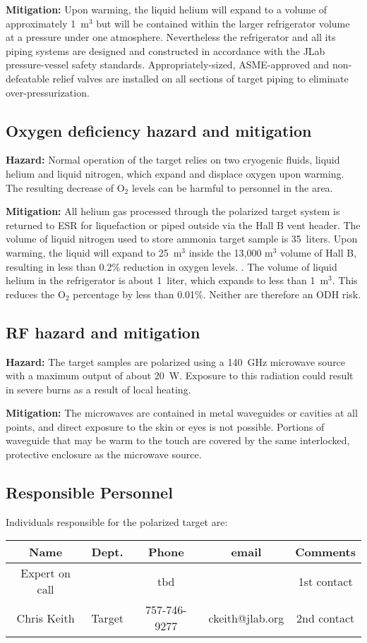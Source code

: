 {\bf Mitigation:} Upon warming, the liquid helium will expand to a volume of approximately 1~m$^3$ but will be contained within the larger refrigerator volume at a pressure under one atmosphere.  Nevertheless the refrigerator and all its piping systems are designed and constructed in accordance with the JLab pressure-vessel safety standards.  Appropriately-sized, ASME-approved and non-defeatable relief valves are installed on all sections of target piping to eliminate over-pressurization.  

\subsection{Oxygen deficiency hazard and mitigation}
 {\bf Hazard:} Normal operation of the target relies on two cryogenic fluids, liquid helium and liquid nitrogen,
 which expand and displace oxygen upon warming.  The resulting decrease of O$_2$ levels can be harmful
 to personnel in the area. 
 
 {\bf Mitigation:}  All helium gas processed through the polarized target system is returned to ESR for liquefaction or piped outside via the Hall B vent header.  The volume of liquid nitrogen used to store ammonia target sample is 35~liters.  Upon warming, the liquid will expand to 25~m$^3$ inside the 13,000 m$^3$ volume of Hall B, resulting in less than 0.2\% reduction in oxygen levels.  .  The volume of liquid helium in the refrigerator is about 1~liter, which expands to less than 1~m$^3$.  This reduces the O$_2$ percentage by less than 0.01\%.  Neither are therefore an ODH risk.  

\subsection{RF hazard and mitigation}
{\bf Hazard:} The target samples are polarized using a 140~GHz microwave source with a maximum output
of about 20~W.  Exposure to this radiation could result in severe burns as a result of local heating.  

{\bf Mitigation:}  The microwaves are contained in metal waveguides or cavities at all points, and
direct exposure to the skin or eyes is not possible.  Portions of waveguide that may be warm to the touch
are covered by the same interlocked, protective enclosure as the microwave source.

\subsection{Responsible Personnel}
Individuals responsible for the polarized target are:
\begin{table}[h]
\begin{tabular}{|c|c|c|c|c|}
\hline
Name           & Dept.  & Phone        & email           & Comments    \\ \hline
Expert on call &        & tbd          &                 & 1st contact \\ \hline
Chris Keith    & Target & 757-746-9277 & ckeith@jlab.org & 2nd contact \\ \hline
\end{tabular}
\end{table}
%